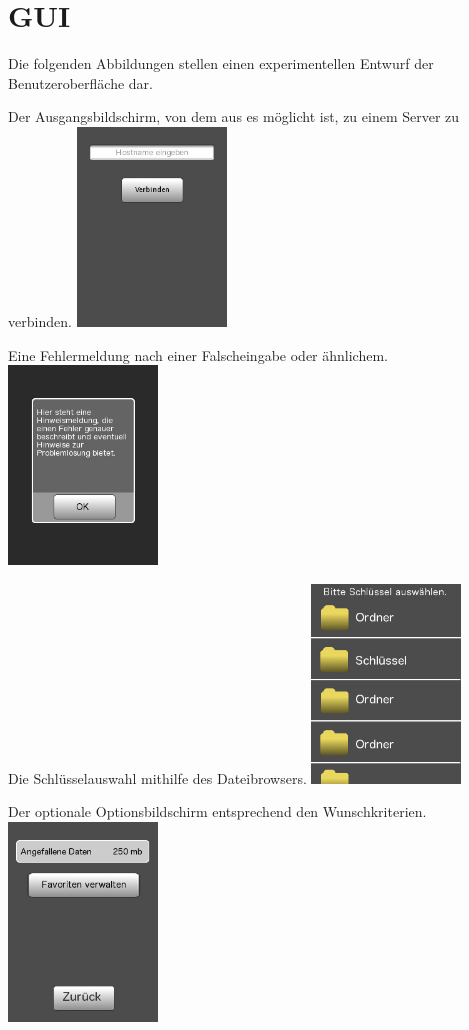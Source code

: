 \documentclass[a4paper,10pt]{scrartcl}
\begin{document}
\section{GUI}
Die folgenden Abbildungen stellen einen experimentellen Entwurf der Benutzeroberfläche dar.
\begin{illustration}{Der Ausgangsbildschirm, von dem aus es möglicht ist, zu einem Server zu verbinden.}
\includegraphics[width=150px]{figures/images/homescreen.jpg}
\end{illustration}
\begin{illustration}{Eine Fehlermeldung nach einer Falscheingabe oder ähnlichem.}
\includegraphics[width=150px]{figures/images/alert.jpg}
\end{illustration}
\begin{illustration}{Die Schlüsselauswahl mithilfe des Dateibrowsers.}
\includegraphics[width=150px]{figures/images/filebrowser.jpg}
\end{illustration}
\begin{illustration}{Der optionale Optionsbildschirm entsprechend den Wunschkriterien.}
\includegraphics[width=150px]{figures/images/optionscreen.jpg}
\end{illustration}
\end{document}
